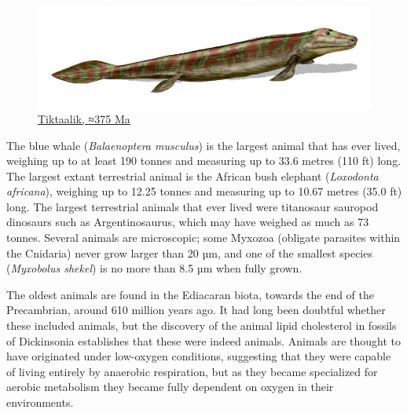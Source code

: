 \begin{figure}

{\centering \includegraphics[width=0.7\linewidth]{./figures/animals/Tiktaalik_BW} 

}

\caption{\href{https://commons.wikimedia.org/wiki/File:Tiktaalik_BW.jpg}{Tiktaalik, ≈375 Ma}}\label{fig:tiktaalik}
\end{figure}

The blue whale (\emph{Balaenoptera musculus}) is the largest animal that has ever lived, weighing up to at least 190 tonnes and measuring up to 33.6 metres (110 ft) long. The largest extant terrestrial animal is the African bush elephant (\emph{Loxodonta africana}), weighing up to 12.25 tonnes and measuring up to 10.67 metres (35.0 ft) long. The largest terrestrial animals that ever lived were titanosaur sauropod dinosaurs such as Argentinosaurus, which may have weighed as much as 73 tonnes. Several animals are microscopic; some Myxozoa (obligate parasites within the Cnidaria) never grow larger than 20 µm, and one of the smallest species (\emph{Myxobolus shekel}) is no more than 8.5 µm when fully grown.

The oldest animals are found in the Ediacaran biota, towards the end of the Precambrian, around 610 million years ago. It had long been doubtful whether these included animals, but the discovery of the animal lipid cholesterol in fossils of Dickinsonia establishes that these were indeed animals. Animals are thought to have originated under low-oxygen conditions, suggesting that they were capable of living entirely by anaerobic respiration, but as they became specialized for aerobic metabolism they became fully dependent on oxygen in their environments.



